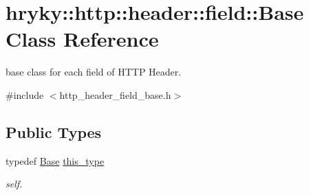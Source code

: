 \hypertarget{classhryky_1_1http_1_1header_1_1field_1_1_base}{\section{hryky\-:\-:http\-:\-:header\-:\-:field\-:\-:Base Class Reference}
\label{classhryky_1_1http_1_1header_1_1field_1_1_base}
}


base class for each field of H\-T\-T\-P Header.  




{\ttfamily \#include $<$http\-\_\-header\-\_\-field\-\_\-base.\-h$>$}

\subsection*{Public Types}
\begin{DoxyCompactItemize}
\item 
\hypertarget{classhryky_1_1http_1_1header_1_1field_1_1_base_ac62199121ede1697541768c2e79f5470}{typedef \hyperlink{classhryky_1_1http_1_1header_1_1field_1_1_base}{Base} \hyperlink{classhryky_1_1http_1_1header_1_1field_1_1_base_ac62199121ede1697541768c2e79f5470}{this\-\_\-type}}\label{classhryky_1_1http_1_1header_1_1field_1_1_base_ac62199121ede1697541768c2e79f5470}

\begin{DoxyCompactList}\small\item\em self. \end{DoxyCompactList}\end{DoxyCompactItemize}
